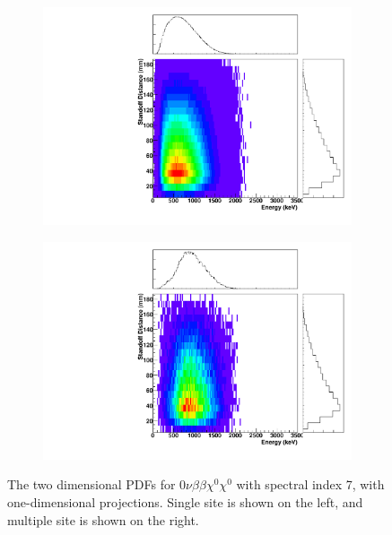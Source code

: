 \documentclass[herrin-thesis.tex]{subfiles}
\begin{document}
\begin{figure}[hp]
\centering
	\begin{subfigure}[b]{0.48\textwidth}
	\centering
	\includegraphics[width=\textwidth]{./plots/PDFs/analysis_pdf_bb0nX7_ss.pdf}
\end{subfigure}\hfill%
\begin{subfigure}[b]{0.48\textwidth}
	\centering
	\includegraphics[width=1\textwidth]{./plots/PDFs/analysis_pdf_bb0nX7_ms.pdf}
	\end{subfigure}
\caption[PDF for \(0\nu\beta\beta\chi^{0}\chi^{0}\)]{The two dimensional PDFs for \(0\nu\beta\beta\chi^{0}\chi^{0}\) with spectral index 7, with one-dimensional projections. Single site is shown on the left, and multiple site is shown on the right.}
\label{fig:analysis_pdf_bb0nX7}
\end{figure}
\end{document}
